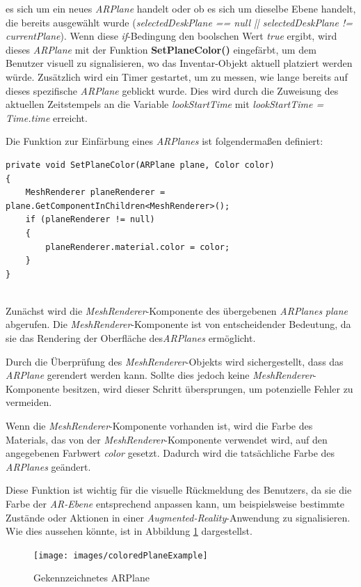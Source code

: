 es sich um ein neues \textit{ARPlane} handelt oder ob es sich um dieselbe Ebene handelt, die bereits ausgewählt wurde
(\textit{selectedDeskPlane == null || selectedDeskPlane != currentPlane}). Wenn diese \textit{if}-Bedingung den boolschen
Wert \textit{true} ergibt, wird dieses \textit{ARPlane} mit der Funktion \textbf{SetPlaneColor()} eingefärbt, um dem
Benutzer visuell zu signalisieren, wo das Inventar-Objekt aktuell platziert werden würde. Zusätzlich wird ein Timer
gestartet, um zu messen, wie lange bereits auf dieses spezifische \textit{ARPlane} geblickt wurde. Dies wird durch die
Zuweisung des aktuellen Zeitstempels an die Variable \textit{lookStartTime} mit \textit{lookStartTime = Time.time} erreicht.

Die Funktion zur Einfärbung eines \textit{ARPlanes} ist folgendermaßen definiert:

\begin{lstlisting}[caption={ARPlane färben}, label=code:color]
private void SetPlaneColor(ARPlane plane, Color color)
{
    MeshRenderer planeRenderer = plane.GetComponentInChildren<MeshRenderer>();
    if (planeRenderer != null)
    {
        planeRenderer.material.color = color;
    }
}
\end{lstlisting}\\
Zunächst wird die \textit{MeshRenderer}-Komponente des übergebenen \textit{ARPlanes} \textit{plane} abgerufen. Die
\textit{MeshRenderer}-Komponente ist von entscheidender Bedeutung, da sie das Rendering der Oberfläche des\textit{ARPlanes}
ermöglicht.

Durch die Überprüfung des \textit{MeshRenderer}-Objekts wird sichergestellt, dass das \textit{ARPlane} gerendert werden
kann. Sollte dies jedoch keine \textit{MeshRenderer}-Komponente besitzen, wird dieser Schritt übersprungen, um potenzielle
Fehler zu vermeiden.

Wenn die \textit{MeshRenderer}-Komponente vorhanden ist, wird die Farbe des Materials, das von der
\textit{MeshRenderer}-Komponente verwendet wird, auf den angegebenen Farbwert \textit{color} gesetzt. Dadurch wird die
tatsächliche Farbe des \textit{ARPlanes} geändert.

Diese Funktion ist wichtig für die visuelle Rückmeldung des Benutzers, da sie die Farbe der \textit{AR-Ebene} entsprechend
anpassen kann, um beispielsweise bestimmte Zustände oder Aktionen in einer \textit{Augmented-Reality}-Anwendung zu
signalisieren. Wie dies aussehen könnte, ist in Abbildung \ref{fig:colPlane} dargestellst.
\begin{figure}[h]
    \centering
    \texttt{[image: images/coloredPlaneExample]}
    \caption{Gekennzeichnetes ARPlane}
    \label{fig:colPlane}
\end{figure}

